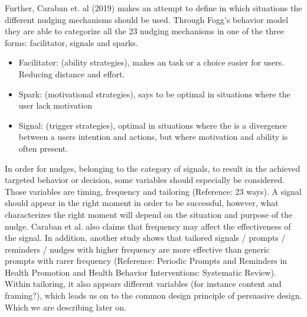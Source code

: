 {Further, Caraban et. al (2019) makes an attempt to define in which situations the different nudging mechanisms should be used. Through Fogg's behavior model they are able to categorize all the 23 nudging mechanisms in one of the three forms: facilitator, signals and sparks.
\begin{itemize}
\item Facilitator: (ability strategies), makes an task or a choice easier for users. Reducing distance and effort. 
\item Spark: (motivational strategies), says to be optimal in situations where the user lack motivation 
\item Signal: (trigger strategies), optimal in situations where the is a divergence between a users intention and actions, but where motivation and ability is often present. 
\end{itemize}

In order for nudges, belonging to the category of signals, to result in the achieved targeted  behavior or decision, some variables should especially be considered. Those variables are timing, frequency and tailoring (Reference: 23 ways). A signal should appear in the right moment in order to be successful, however, what characterizes the right moment will depend on the situation and purpose of the nudge. Caraban et al. also claims that frequency may affect the effectiveness of the signal. In addition, another study shows that tailored signals / prompts / reminders / nudges with higher frequency are more effective than generic prompts with rarer frequency (Reference: Periodic Prompts and Reminders in Health Promotion and Health Behavior Interventions: Systematic Review). Within tailoring, it also appears different variables (for instance content and framing?), which leads us on to the common design principle of persuasive design. Which we are describing later on.  

}
